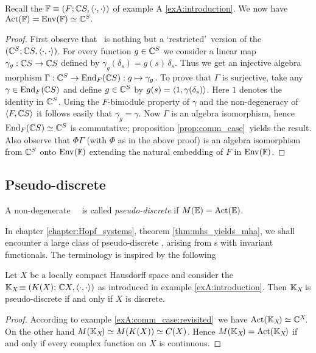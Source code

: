 \begin{exA} \label{exA:comm_case:revisited}
  Recall the \context\/ $\mathbb{F} \equiv (F; \mathbb{C} S, \langle\cdot, \cdot\rangle)$ of example
  {\rm A \ref{exA:introduction}}\@.
  We now have  ${\rm Act}(\mathbb{F}) = {\rm Env}(\mathbb{F}) \simeq \mathbb{C}^S.$
\end{exA}

\begin{proof}
First observe that \FF\ is nothing but a \lq restricted\rq\ version of
the \context\ $(\mathbb{C}^S; \mathbb{C} S, \langle\cdot, \cdot\rangle)$.
For every function $g\in \mathbb{C}^S$ we consider a linear map $\gamma_g : \mathbb{C} S \rightarrow  \mathbb{C} S$
defined by $\gamma_g(\delta_s) = g(s)\,\delta_s$. Thus we get an injective algebra morphism
$\Gamma : \mathbb{C}^S \rightarrow  {\rm End}_F(\mathbb{C} S) : g \mapsto \gamma_g$.
To prove that $\Gamma$ is surjective, take any $\gamma \in {\rm End}_F(\mathbb{C} S)$
and define $g\in \mathbb{C}^S$ by $g(s) = \langle 1,\gamma(\delta_s) \rangle$.
Here $1$ denotes the identity in $\mathbb{C}^S$.
Using the $F$-bimodule property of $\gamma$ and the non-degeneracy of $\langle F,\mathbb{C} S \rangle$
it follows easily that $\gamma_g=\gamma$.
Now $\Gamma$ is an algebra isomorphism, hence ${\rm End}_F(\mathbb{C} S) \simeq \mathbb{C}^S$ is
commutative; proposition \ref{prop:comm_case}\ yields the result.
Also observe that $\Phi\Gamma$ (with $\Phi$ as in the above proof)
is an algebra isomorphism from $\mathbb{C}^S$ onto ${\rm Env}(\mathbb{F})$ extending
the natural embedding of $F$ in ${\rm Env}(\mathbb{F})$.
\end{proof}




\subsection{Pseudo-discrete \contexts}

\begin{defn} \label{def:pseudo_discrete}
A non-degenerate \context\ \EE\ is called {\em pseudo-discrete\/} if $M(\mathbb{E}) = \mbox{\rm Act}(\mathbb{E})$.
\end{defn}

In chapter \ref{chapter:Hopf_systems}, theorem \ref{thm:mhs_yields_mha}, we
shall encounter a large class of pseudo-discrete \contexts, arising from \mha s
with invariant functionals. The terminology is inspired by the following

\begin{exA}
Let\/ $X$ be a locally compact Hausdorff space and consider the \context\/
$\mathbb{K}_X \! \equiv (K(X); \, \mathbb{C} X, \langle\cdot, \cdot\rangle)$ as introduced in example \ref{exA:introduction}\@.
Then\/ $\mathbb{K}_X \!$ is pseudo-discrete if and only if\/ $X$ is discrete.
\end{exA}
\begin{proof}
According to example \ref{exA:comm_case:revisited}\ we have $\mbox{\rm Act}(\mathbb{K}_X \!) \simeq \mathbb{C}^X \!$.
On the other hand $M(\mathbb{K}_X \!) \simeq M(K(X)) \simeq C(X)$.
Hence $M(\mathbb{K}_X \!) = \mbox{\rm Act}(\mathbb{K}_X \!)$ if and only if
every complex function on $X$ is continuous.
\end{proof}
